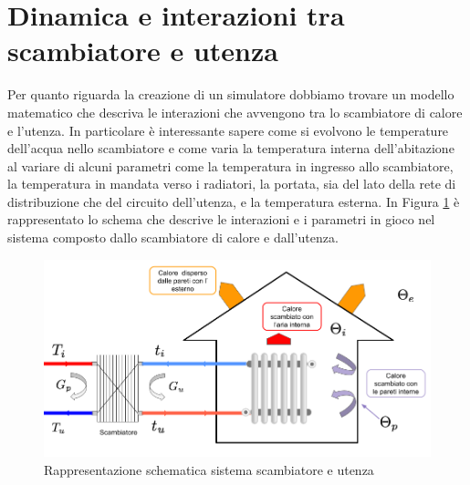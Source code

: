\documentclass[laurea,oneside,11pt]{USiena_tesiLM3}
\begin{document}
\section{Dinamica e interazioni tra scambiatore e utenza}
Per quanto riguarda la creazione di un simulatore dobbiamo trovare un modello matematico che descriva le interazioni che avvengono tra lo scambiatore di calore e l'utenza. In particolare è interessante sapere come si evolvono le temperature dell'acqua nello scambiatore e come varia la temperatura interna dell'abitazione al variare di alcuni parametri come la temperatura in ingresso allo scambiatore, la temperatura in mandata verso i radiatori, la portata, sia del lato della rete di distribuzione che del circuito dell'utenza, e la temperatura esterna.
In Figura \ref{fig:scamb_utenza} è rappresentato lo schema che descrive le interazioni e i parametri in gioco nel sistema composto dallo scambiatore di calore e dall'utenza. 

\begin{figure}[h]
\begin{center}
\includegraphics[width=\textwidth]{figure/scamb_utenza} %
\caption{Rappresentazione schematica sistema scambiatore e utenza}
\label{fig:scamb_utenza}
\end{center}
\end{figure}
\end{document}
